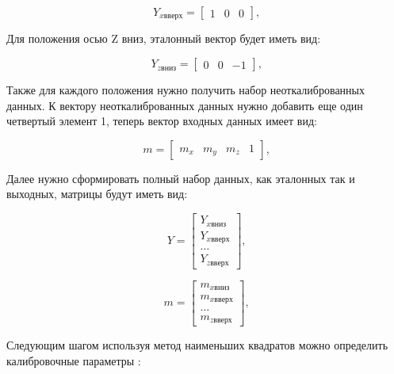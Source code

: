 \begin{equation}
    \label{eq:domain:Yxup}
    Y_{xвверх} = \begin{bmatrix}
            1 & 0 & 0
        \end{bmatrix}
        \text{,}
  \end{equation}

Для положения осью Z вниз, эталонный вектор будет иметь вид:

\begin{equation}
    \label{eq:domain:Yzdown}
    Y_{zвниз} = \begin{bmatrix}
            0 & 0 & -1
        \end{bmatrix}
        \text{,}
  \end{equation}

Также для каждого положения нужно получить набор неоткалиброванных данных. 
К вектору неоткалиброванных данных нужно добавить еще один четвертый элемент 1, теперь вектор входных данных имеет вид:

\begin{equation}
    \label{eq:domain:XL_meas}
    m = \begin{bmatrix}
            m_{x} & m_{y} & m_{z} & 1
        \end{bmatrix}
        \text{,}
  \end{equation}

Далее нужно сформировать полный набор данных, как эталонных так и выходных, матрицы будут иметь вид:

\begin{equation}
    \label{eq:domain:XL_Y_dataset}
    Y = \begin{bmatrix}
            Y_{xвниз} \\ Y_{xвверх} \\ \dots \\ Y_{zвверх}
        \end{bmatrix}
        \text{,}
  \end{equation}


\begin{equation}
    \label{eq:domain:XL_M_dataset}
    m = \begin{bmatrix}
            m_{xвниз} \\ m_{xвверх} \\ \dots \\ m_{zвверх}
        \end{bmatrix}
        \text{,}
  \end{equation}

Следующим шагом используя метод наименьших квадратов можно определить калибровочные параметры \cite{accelerometer}:

